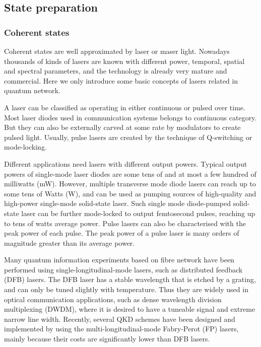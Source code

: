 \documentclass[aps,rmp,twocolumn,amsmath,amssymb,nofootinbib,superscriptaddress,longbibliography,floatfix,table-of-contents,eqsecnum]{revtex4-1}
\begin{document}
%
%

\subsection{State preparation} 

%
%

\subsubsection{Coherent states} 

Coherent states are well approximated by laser or maser light. Nowadays thousands of kinds of lasers are known with different power, temporal, spatial and spectral parameters, and the technology is already very mature and commercial. Here we only introduce some basic concepts of lasers related in quantum network.

A laser can be classified as operating in either continuous or pulsed over time. Most laser diodes used in communication systems belongs to continuous category. But they can also be externally carved at some rate by modulators to create pulsed light. Usually, pulse lasers are created by the technique of Q-switching or mode-locking.

Different applications need lasers with different output powers. Typical output powers of single-mode laser diodes are some tens of and at most a few hundred of milliwatts (mW). However, multiple transverse mode diode lasers can reach up to some tens of Watts (W), and can be used as pumping sources of high-quality and high-power single-mode solid-state laser. Such single mode diode-pumped solid-state laser can be further mode-locked to output femtosecond pulses, reaching up to tens of watts average power. Pulse lasers can also be characterised with the peak power of each pulse. The peak power of a pulse laser is many orders of magnitude greater than its average power.

Many quantum information experiments based on fibre network \cite{sun2016quantum} have been performed using single-longitudinal-mode lasers, such as distributed feedback (DFB) lasers. The DFB laser has a stable wavelength that is etched by a grating, and can only be tuned slightly with temperature. Thus they are widely used in optical communication applications, such as dense wavelength division multiplexing (DWDM), where it is desired to have a tuneable signal and extreme narrow line width. Recently, several QKD schemes \cite{choi2011quantum, wang2015experimental} have been designed and implemented by using the multi-longitudinal-mode Fabry-Perot (FP) lasers, mainly because their costs are significantly lower than DFB lasers.
\end{document}
